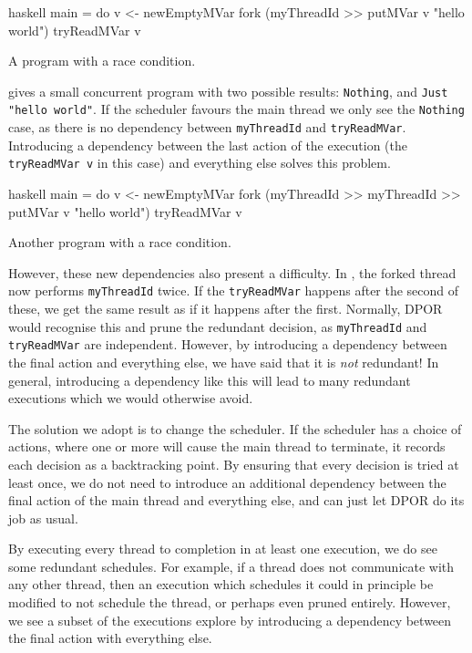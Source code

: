 \begin{listing}
\centering
\begin{cminted}{haskell}
main = do
  v <- newEmptyMVar
  fork (myThreadId >> putMVar v "hello world")
  tryReadMVar v
\end{cminted}
\caption{A program with a race condition.}\label{lst:daemon1}
\end{listing}

 gives a small concurrent program with two possible
results: \verb|Nothing|, and \verb|Just "hello world"|.  If the
scheduler favours the main thread we only see the \verb|Nothing| case,
as there is no dependency between \verb|myThreadId| and
\verb|tryReadMVar|.  Introducing a dependency between the last action
of the execution (the \verb|tryReadMVar v| in this case) and
everything else solves this problem.

\begin{listing}
\centering
\begin{cminted}{haskell}
main = do
  v <- newEmptyMVar
  fork (myThreadId >> myThreadId >> putMVar v "hello world")
  tryReadMVar v
\end{cminted}
\caption{Another program with a race condition.}\label{lst:daemon2}
\end{listing}

However, these new dependencies also present a difficulty.  In
, the forked thread now performs \verb|myThreadId|
twice.  If the \verb|tryReadMVar| happens after the second of these,
we get the same result as if it happens after the first.  Normally,
DPOR would recognise this and prune the redundant decision, as
\verb|myThreadId| and \verb|tryReadMVar| are independent.  However, by
introducing a dependency between the final action and everything else,
we have said that it is \emph{not} redundant!  In general, introducing
a dependency like this will lead to many redundant executions which we
would otherwise avoid.

The solution we adopt is to change the scheduler.  If the scheduler
has a choice of actions, where one or more will cause the main thread
to terminate, it records each decision as a backtracking point.  By
ensuring that every decision is tried at least once, we do not need to
introduce an additional dependency between the final action of the
main thread and everything else, and can just let DPOR do its job as
usual.

By executing every thread to completion in at least one execution, we
do see some redundant schedules.  For example, if a thread does not
communicate with any other thread, then an execution which schedules
it could in principle be modified to not schedule the thread, or
perhaps even pruned entirely.  However, we see a subset of the
executions explore by introducing a dependency between the final
action with everything else.

